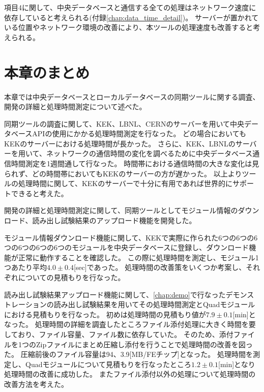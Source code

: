 項目4に関して、中央データベースと通信する全ての処理はネットワーク速度に依存していると考えられる(付録\ref{chap:data_time_detail})。
サーバーが置かれている位置やネットワーク環境の改善により、本ツールの処理速度も改善すると考えられる。

\section{本章のまとめ}
本章では中央データベースとローカルデータベースの同期ツールに関する調査、開発の詳細と処理時間測定について述べた。

同期ツールの調査に関して、KEK、LBNL、CERNのサーバーを用いて中央データベースAPIの使用にかかる処理時間測定を行なった。
どの場合においてもKEKのサーバーにおける処理時間が長かった。
さらに、KEK、LBNLのサーバーを用いて、ネットワークの通信時間の変化を調べるために中央データベース通信時間測定を1週間通して行なった。 
時間帯における通信時間の大きな変化は見られず、どの時間帯においてもKEKのサーバーの方が遅かった。
以上よりツールの処理時間に関して、KEKのサーバーで十分に有用であれば世界的にサポートできると考えた。

開発の詳細と処理時間測定に関して、同期ツールとしてモジュール情報のダウンロード、読み出し試験結果のアップロード機能を開発した。

モジュール情報ダウンロード機能に関して、KEKで実際に作られた6つの6つの6つの6つの6つの6つのモジュールを中央データベースに登録し、ダウンロード機能が正常に動作することを確認した。
この際に処理時間を測定し、モジュール1つあたり平均$4.0\pm 0.4$[sec]であった。
処理時間の改善策をいくつか考案し、それぞれについての見積もりを行なった。

読み出し試験結果アップロード機能に関して、\ref{chap:demo}で行なったデモンストレーションの読み出し試験結果を用いてその処理時間測定とQuadモジュールにおける見積もりを行なった。
初めは処理時間の見積もり値が$7.9\pm 0.1$[min]となった。
処理時間の詳細を調査したところファイル添付処理に大きく時間を要しており、ファイル容量、ファイル数に依存していた。
そのため、添付ファイルを1つのZipファイルにまとめ圧縮し添付を行うことで処理時間の改善を図った。
圧縮前後のファイル容量は94、3.9[MB/FEチップ]となった。
処理時間を測定し、Quadモジュールについて見積もりを行なったところ$1.2\pm 0.1$[min]となり処理時間の改善に成功した。
またファイル添付以外の処理について処理時間の改善方法を考えた。

